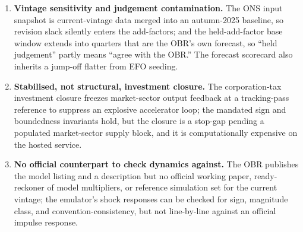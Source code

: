 \begin{enumerate}
\item \textbf{Vintage sensitivity and judgement contamination.} The ONS input snapshot is current-vintage data merged into an autumn-2025 baseline, so revision slack silently enters the add-factors; and the held-add-factor base window extends into quarters that are the OBR's own forecast, so ``held judgement'' partly means ``agree with the OBR.'' The forecast scorecard also inherits a jump-off flatter from EFO seeding.

\item \textbf{Stabilised, not structural, investment closure.} The corporation-tax investment closure freezes market-sector output feedback at a tracking-pass reference to suppress an explosive accelerator loop; the mandated sign and boundedness invariants hold, but the closure is a stop-gap pending a populated market-sector supply block, and it is computationally expensive on the hosted service.

\item \textbf{No official counterpart to check dynamics against.} The OBR publishes the model listing and a description \citep{obr2013model} but no official working paper, ready-reckoner of model multipliers, or reference simulation set for the current vintage; the emulator's shock responses can be checked for sign, magnitude class, and convention-consistency, but not line-by-line against an official impulse response.
\end{enumerate}
